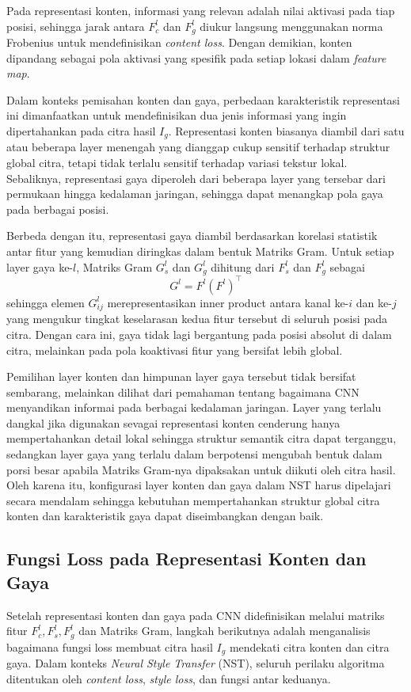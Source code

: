 Pada representasi konten, informasi yang relevan adalah nilai aktivasi pada tiap posisi, sehingga jarak antara $F_c^l$ dan $F_g^l$ diukur langsung menggunakan norma Frobenius untuk mendefinisikan \textit{content loss}. Dengan demikian, konten dipandang sebagai pola aktivasi yang spesifik pada setiap lokasi dalam \textit{feature map}.

Dalam konteks pemisahan konten dan gaya, perbedaan karakteristik representasi ini dimanfaatkan untuk mendefinisikan dua jenis informasi yang ingin dipertahankan pada citra hasil $I_g$. Representasi konten biasanya diambil dari satu atau beberapa layer menengah yang dianggap cukup sensitif terhadap struktur global citra, tetapi tidak terlalu sensitif terhadap variasi tekstur lokal. Sebaliknya, representasi gaya diperoleh dari beberapa layer yang tersebar dari permukaan hingga kedalaman jaringan, sehingga dapat menangkap pola gaya pada berbagai posisi.


Berbeda dengan itu, representasi gaya diambil berdasarkan korelasi statistik antar fitur yang kemudian diringkas dalam bentuk Matriks Gram. Untuk setiap layer gaya ke-$l$, Matriks Gram $G_s^l$ dan $G_g^l$ dihitung dari $F_s^l$ dan $F_g^l$ sebagai
$$
G^l = F^l (F^l)^\top
$$
sehingga elemen $G_{ij}^l$ merepresentasikan inner product antara kanal ke-$i$ dan ke-$j$ yang mengukur tingkat keselarasan kedua fitur tersebut di seluruh posisi pada citra. Dengan cara ini, gaya tidak lagi bergantung pada posisi absolut di dalam citra, melainkan pada pola koaktivasi fitur yang bersifat lebih global. 

Pemilihan layer konten dan himpunan layer gaya tersebut tidak bersifat sembarang, melainkan dilihat dari pemahaman tentang bagaimana CNN menyandikan informai pada berbagai kedalaman jaringan. Layer yang terlalu dangkal jika digunakan sevagai representasi konten cenderung hanya mempertahankan detail lokal sehingga struktur semantik citra dapat terganggu, sedangkan layer gaya yang terlalu dalam berpotensi mengubah bentuk dalam porsi besar apabila Matriks Gram-nya dipaksakan untuk diikuti oleh citra hasil. Oleh karena itu, konfigurasi layer konten dan gaya dalam NST harus dipelajari secara mendalam sehingga kebutuhan mempertahankan struktur global citra konten dan karakteristik gaya dapat diseimbangkan dengan baik.


\subsection{Fungsi Loss pada Representasi Konten dan Gaya}
Setelah representasi konten dan gaya pada CNN didefinisikan melalui matriks fitur $F_c^l, F_s^l, F_g^l$ dan Matriks Gram, langkah berikutnya adalah menganalisis bagaimana fungsi loss membuat citra hasil $I_g$ mendekati citra konten dan citra gaya. Dalam konteks \textit{Neural Style Transfer} (NST), seluruh perilaku algoritma ditentukan oleh \textit{content loss}, \textit{style loss}, dan fungsi antar keduanya.

